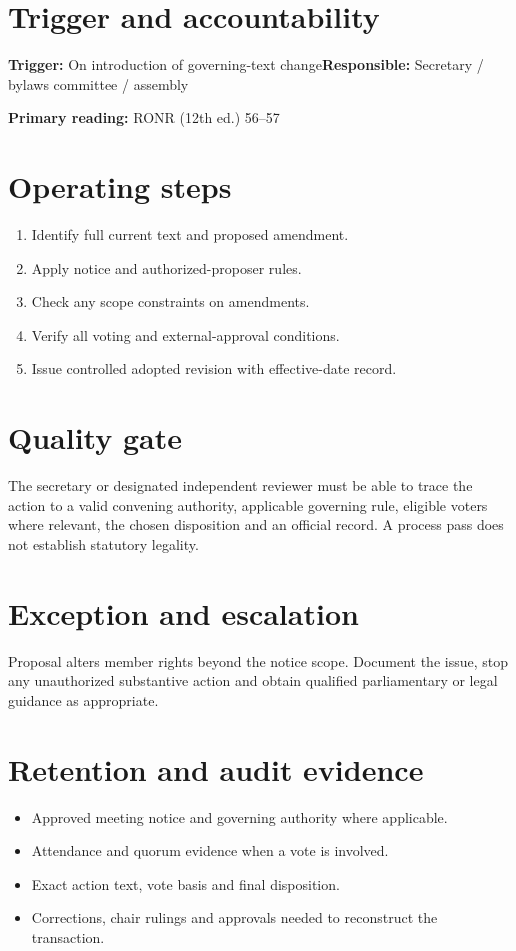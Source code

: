 \documentclass[11pt]{article}
\begin{document}
\SuiteOpen
{}
\section{Trigger and accountability}
\textbf{Trigger:} On introduction of governing-text change\quad\textbf{Responsible:} Secretary / bylaws committee / assembly

\textbf{Primary reading:} RONR (12th ed.) 56--57

\section{Operating steps}
\begin{enumerate}[leftmargin=*,itemsep=4pt]
\item Identify full current text and proposed amendment.
\item Apply notice and authorized-proposer rules.
\item Check any scope constraints on amendments.
\item Verify all voting and external-approval conditions.
\item Issue controlled adopted revision with effective-date record.
\end{enumerate}

\section{Quality gate}
The secretary or designated independent reviewer must be able to trace the action to a valid convening authority, applicable governing rule, eligible voters where relevant, the chosen disposition and an official record. A process pass does not establish statutory legality.

\section{Exception and escalation}
Proposal alters member rights beyond the notice scope. Document the issue, stop any unauthorized substantive action and obtain qualified parliamentary or legal guidance as appropriate.

\section{Retention and audit evidence}
\begin{itemize}[leftmargin=*,itemsep=4pt]
\item Approved meeting notice and governing authority where applicable.
\item Attendance and quorum evidence when a vote is involved.
\item Exact action text, vote basis and final disposition.
\item Corrections, chair rulings and approvals needed to reconstruct the transaction.
\end{itemize}
\end{document}
